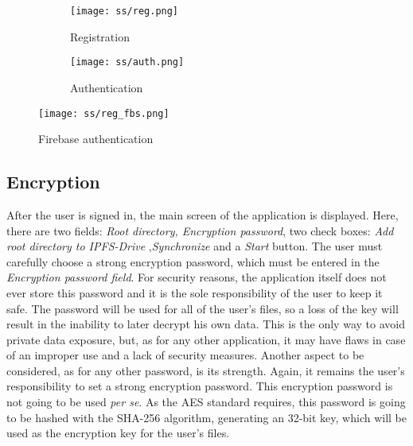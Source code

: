 \documentclass[12pt]{report}
\begin{document}
\begin{figure}[H]
 
  \begin{subfigure}{0.47\textwidth}
    \texttt{[image: ss/reg.png]}
\caption{Registration}
\label{fig:reg}
  \end{subfigure}
 \hfill
 \begin{subfigure}{0.47\textwidth}
    \texttt{[image: ss/auth.png]}
    
    \caption{Authentication}
    \label{fig:auth}
  \end{subfigure}

\caption{}

\end{figure}

\begin{figure}[H]
\centerline{\texttt{[image: ss/reg\_fbs.png]}}
    \caption{Firebase authentication}
    \label{fig:regfbs}

\end{figure}

\subsection{Encryption}

After the user is signed in, the main screen of the application is displayed. Here, there are two fields: \textit{Root directory, Encryption password}, two check boxes: \textit{Add root directory to IPFS-Drive} ,\textit{Synchronize} and a \textit{Start} button. The user must carefully choose a strong encryption password, which must be entered in the \textit{Encryption password field}. For security reasons, the application itself does not ever store this password and it is the sole responsibility of the user to keep it safe. The password will be used for all of the user's files, so a loss of the key will result in the inability to later decrypt his own data. This is the only way to avoid private data exposure, but, as for any other application, it may have flaws in case of an improper use and a lack of security measures. Another aspect to be considered, as for any other password, is its strength. Again, it remains the user's responsibility to set a strong encryption password. This encryption password is not going to be used \textit{per se}. As the AES standard requires, this password is going to be hashed with the SHA-256 algorithm, generating an 32-bit key, which will be used as the encryption key for the user's files.
\end{document}

